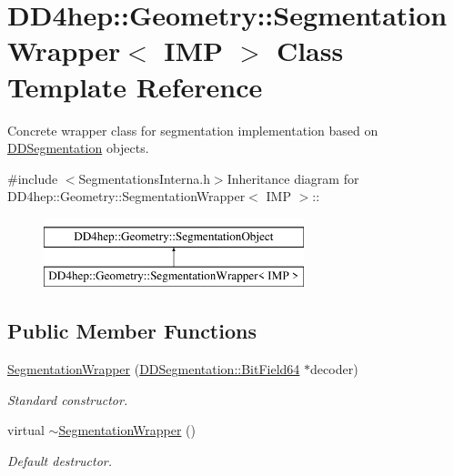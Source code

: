 \hypertarget{class_d_d4hep_1_1_geometry_1_1_segmentation_wrapper}{
\section{DD4hep::Geometry::SegmentationWrapper$<$ IMP $>$ Class Template Reference}
\label{class_d_d4hep_1_1_geometry_1_1_segmentation_wrapper}
}


Concrete wrapper class for segmentation implementation based on \hyperlink{namespace_d_d4hep_1_1_d_d_segmentation}{DDSegmentation} objects.  


{\ttfamily \#include $<$SegmentationsInterna.h$>$}Inheritance diagram for DD4hep::Geometry::SegmentationWrapper$<$ IMP $>$::\begin{figure}[H]
\begin{center}
\leavevmode
\includegraphics[height=2cm]{class_d_d4hep_1_1_geometry_1_1_segmentation_wrapper}
\end{center}
\end{figure}
\subsection*{Public Member Functions}
\begin{DoxyCompactItemize}
\item 
\hyperlink{class_d_d4hep_1_1_geometry_1_1_segmentation_wrapper_a422a008dd4769304777684a719f5801f}{SegmentationWrapper} (\hyperlink{class_d_d4hep_1_1_d_d_segmentation_1_1_bit_field64}{DDSegmentation::BitField64} $\ast$decoder)
\begin{DoxyCompactList}\small\item\em Standard constructor. \item\end{DoxyCompactList}\item 
virtual \hyperlink{class_d_d4hep_1_1_geometry_1_1_segmentation_wrapper_a0fe7f6d55cdf27640ee18c8606b659b2}{$\sim$SegmentationWrapper} ()
\begin{DoxyCompactList}\small\item\em Default destructor. \item\end{DoxyCompactList}\end{DoxyCompactItemize}
